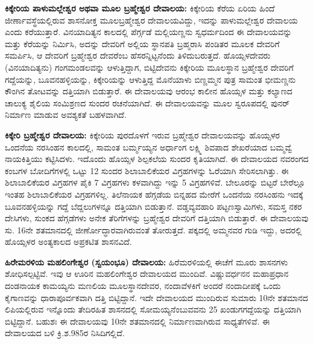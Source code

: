 \textbf{ಕಿಕ್ಕೇರಿಯ ಪಾಳುಮಲ್ಲೇಶ್ವರ ಅಥವಾ ಮೂಲ ಬ್ರಹ್ಮೇಶ್ವರ ದೇವಾಲಯ:} ಕಿಕ್ಕೇರಿಯ ಕೆರೆಯ ಏರಿಯ ಹಿಂದೆ ಜೀರ್ಣಾವಸ್ಥೆಯಲ್ಲಿರುವ ಶಾಸನೋಕ್ತ ಮೂಲಬ್ರಹ್ಮೇಶ್ವರ ದೇವಾಲಯವಿದ್ದು, ಇದನ್ನು ಪಾಳುಮಲ್ಲೇಶ್ವರ ದೇವಾಲಯ ಎಂದು ಕರೆಯುತ್ತಾರೆ. ವಿನಯಾದಿತ್ಯನ ಕಾಲದಲ್ಲಿ ಪೆರ್ಗ್ಗಡೆ ಮಲ್ಲಿಯಣ್ಣನು ಸ್ವಧರ್ಮದಿಂದ ಈ ದೇವಾಲಯವನ್ನು ಮತ್ತು ಕೆರೆಯನ್ನು ನಿರ್ಮಿಸಿ, ಅದನ್ನು ದೇವರಿಗೆ ಅಲ್ಲಿಯ ಸ್ಥಾನಪತಿ ಬ್ರಹ್ಮರಾಸಿ ಪಂಡಿತರ ಮೂಲಕ ದೇವರಿಗೆ ಸಮರ್ಪಿಸಿ, ಆ ದೇವರಿಗೆ ಬ್ರಹ್ಮೇಶ್ವರ ದೇವರೆಂಬ ಹೆಸರನ್ನಿಟ್ಟನೆಂದು ತಿಳಿದುಬರುತ್ತದೆ. ಹೊಯ್ಸಳದೇವರು (ವಿನಯಾದಿತ್ಯನು) ಗಂಗಮಂಡಲವನ್ನು ಆಳುತ್ತಿದ್ದಾಗ, ಬಿಟ್ಟಿದೇವನು ಕಿಕ್ಕೇರಿಯ ಮೂಲಸ್ಥಾನ ಬ್ರಹ್ಮೇಶ್ವರ ದೇವರಿಗೆ ಗದ್ದೆಯನ್ನು, ಬೂವನಹಳ್ಳಿಯನ್ನು, ಕಿಕ್ಕೇರಿಯನ್ನು ಆಳುತ್ತಿದ್ದ ಮೊನೆಯಾಳು ಬಿಣ್ಣಮ್ಮನ ಪುತ್ರ ಸಾಮಂತ ಭೀಮಣ್ಣನು ಕೌಂಗಿನ ತೋಟವನ್ನು ದತ್ತಿಯಾಗಿ ಬಿಡುತ್ತಾರೆ. ಈ ದೇವಾಲಯವು ಆರಂಭ ಕಾಲೀನ ಹೊಯ್ಸಳ ಮತ್ತು ಕಲ್ಯಾಣದ ಚಾಲುಕ್ಯ ಶೈಲಿಯ ಸಂಮಿಶ್ರಣದ ಸುಂದರ ರಚನೆಯಾಗಿದೆ. ಈ ದೇವಾಲಯವನ್ನು ಮೂಲ ಸ್ವರೂಪದಲ್ಲಿ ಪುನರ್‌ ನಿರ್ಮಾಣ ಮಾಡುವ ಅವಶ್ಯಕತೆ ಬಹಳವಾಗಿದೆ.

\textbf{ಕಿಕ್ಕೇರಿ ಬ್ರಹ್ಮೇಶ್ವರ ದೇವಾಲಯ:} ಕಿಕ್ಕೇರಿಯ ಪುರದೊಳಗೆ ಇರುವ ಬ್ರಹ್ಮೇಶ್ವರ ದೇವಾಲಯವನ್ನು ಹೊಯ್ಸಳರ ಒಂದನೆಯ ನರಸಿಂಹನ ಕಾಲದಲ್ಲಿ, ಸಾಮಂತ ಬರ್ಮ್ಮಯ್ಯನ ಅರ್ಧಾಂಗ ಲಕ್ಷ್ಮಿ ಶಿವಪಾದ ಶೇಖರೆಯಾದ ಬಮ್ಮವ್ವೆ ನಾಯಕಿತ್ತಿಯು ಕಟ್ಟಿಸಿದಳು. ಇದೊಂದು ಹೊಯ್ಸಳ ಶಿಲ್ಪಕಲೆಯ ಸುಂದರ ಕೃತಿಯಾಗಿದೆ. ಈ ದೇವಾಲಯದ ನವರಂಗದ ಕಂಬಗಳ ಬೋದಿಗೆಗಳಲ್ಲಿ ಒಟ್ಟು 12 ಸುಂದರ ಶಿಲಾಬಾಲಿಕೆಯರ ವಿಗ್ರಹಗಳನ್ನು ಓರೆಯಾಗಿ ಸೇರಿಸಲಾಗಿತ್ತು. ಈ ಶಿಲಾಬಾಲಿಕೆಯರ ವಿಗ್ರಹಗಳ ಪೈಕಿ 7 ವಿಗ್ರಹಗಳು ಕಳವಾಗಿದ್ದು ಇನ್ನು 5 ವಿಗ್ರಹಗಳಿವೆ. ಬೇಲೂರನ್ನು ಬಿಟ್ಟರೆ ಬೇರೆಲ್ಲೂ ಇಂತಹ ಶಿಲಾಬಾಲಿಕೆಯರ ವಿಗ್ರಹಗಳಿಲ್ಲ. ತಿಲೆನಾಯಕ ಹೆಗ್ಗಡೆಯ ಬಿನ್ನಹದ ಮೇರೆಗೆ ಒಂದನೆಯ ನರಸಿಂಹನು ಇದಕ್ಕೆ ಬೂವನಹಳ್ಳಿಯನ್ನು ಗದ್ದೆ ಬೆದ್ದಲುಗಳನ್ನೂ ದತ್ತಿಯಾಗಿ ಬಿಡುತ್ತಾನೆ. ವಡ್ಡವ್ಯವಹಾರಿ ಪಟ್ಟಣಸ್ವಾಮಿಗಳು, ಸಮಸ್ತ ನಕರ ದೇಸಿಗಳು, ಸುಂಕದ ಹೆಗ್ಗಡೆಗಳು ಅನೇಕ ತೆರಿಗೆಗಳನ್ನು ಬ್ರಹ್ಮೇಶ್ವರ ದೇವರಿಗೆ ದತ್ತಿಯಾಗಿ ಬಿಡುತ್ತಾರೆ. ಈ ದೇವಾಲಯವು ಸು. 16ನೇ ಶತಮಾನದಲ್ಲಿ ಜೀರ್ಣೋದ್ಧಾರವಾಗಿರುವಂತೆ ತೋರುತ್ತದೆ. ಪಕ್ಕದಲ್ಲಿ ಅಮ್ಮನವರ ಗುಡಿ ಇದ್ದು, ಅದರಲ್ಲಿ ಹೊಯ್ಸಳರ ಅಂತ್ಯಕಾಲದ ಅಪ್ರಕಟಿತ ಶಾಸನವಿದೆ.

\textbf{ಹಿರೇಮರಳಿಯ ಮಹಲಿಂಗೇಶ್ವರ (ಸ್ವಯಂಭೂ) ದೇವಾಲಯ:} ಹಿರೆಮರಳಿಯಲ್ಲಿ ಈಚೆಗೆ ಮೂರು ಶಾಸನಗಳು ಶೋಧಿಸಲ್ಪಟ್ಟಿವೆ. ಇವು ಆ ಊರಿನ ಮಹಲಿಂಗೇಶ್ವರ ದೇವಾಲಯದ ಮುಂದಿವೆ. ವಿಷ್ಣುವರ್ಧನನ ಮಹಾಪ್ರಧಾನ ದಂಡನಾಯಕ ಕಾಮಯ್ಯನು ಮಣಲಿಯ ಮೂಲಸ್ಥಾನದೇವರ, ನಂದಾವೆಳಕಿಗೆ ಅಂದರೆ ನಂದಾದೀಪಕ್ಕೆ ಒಂದು ಕೈಗಾಣವನ್ನು ಧಾರಾಪೂರ್ವಕವಾಗಿ ದತ್ತಿ ಬಿಟ್ಟಿದ್ದಾನೆ. ಇದೇ ದೇವಾಲಯದ ಮುಂದಿರುವ ಸುಮಾರು 10ನೇ ಶತಮಾನದ ಲಿಪಿಯಲ್ಲಿರುವ ಇನ್ನೊಂದು ತೇದಿರಹಿತ ಶಾಸನದಲ್ಲಿ ಸೋಮಯ್ಯನೆಂಬುವವನು 25 ಖಂಡುಗಗದ್ದೆಯನ್ನು ದತ್ತಿಯಾಗಿ ಬಿಟ್ಟಿದ್ದಾನೆ. ಬಹುಶಃ ಈ ದೇವಾಲಯವು 10ನೇ ಶತಮಾನದಲ್ಲಿ ನಿರ್ಮಾಣವಾಗಿರುವ ಸಾಧ್ಯತೆಗಳಿವೆ. ಈ ದೇವಾಲಯದ ಬಳಿ ಕ್ರಿ.ಶ.985ರ ನಿಸಿದಿಗಲ್ಲಿದೆ.

